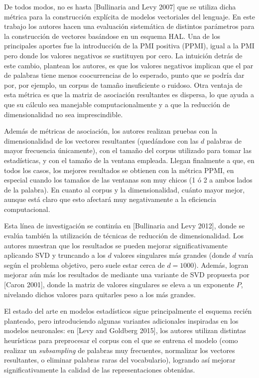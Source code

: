 De todos modos, no es hasta [Bullinaria and Levy 2007] que se utiliza dicha métrica para la
construcción explícita de modelos vectoriales del lenguaje. En este trabajo los autores hacen una
evaluación sistemática de distintos parámetros para la construcción de vectores basándose en un
esquema HAL\@. Una de los principales aportes fue la introducción de la PMI positiva (PPMI), igual a
la PMI pero donde los valores negativos se sustituyen por cero. La intuición detrás de este cambio,
plantean los autores, es que los valores negativos implican que el par de palabras tiene menos
coocurrencias de lo esperado, punto que se podría dar por, por ejemplo, un corpus de tamaño
insuficiente o ruidoso. Otra ventaja de esta métrica es que la matriz de asociación resultantes es
dispersa, lo que ayuda a que su cálculo sea manejable computacionalmente y a que la reducción de
dimensionalidad no sea imprescindible.

Además de métricas de asociación, los autores realizan pruebas con la dimensionalidad de los
vectores resultantes (quedándose con las $d$ palabras de mayor frecuencia únicamente), con el tamaño
del corpus utilizado para tomar las estadísticas, y con el tamaño de la ventana empleada. Llegan
finalmente a que, en todos los casos, los mejores resultados se obtienen con la métrica PPMI, en
especial cuando los tamaños de las ventanas son muy chicos (1 ó 2 a ambos lados de la palabra). En
cuanto al corpus y la dimensionalidad, cuánto mayor mejor, aunque está claro que esto afectará muy
negativamente a la eficiencia computacional.

Esta línea de investigación se continúa en [Bullinaria and Levy 2012], donde se evalúa también la
utilización de técnicas de reducción de dimensionalidad. Los autores muestran que los resultados se
pueden mejorar significativamente aplicando SVD y truncando a los $d$ valores singulares más grandes
(donde $d$ varía según el problema objetivo, pero suele estar cerca de $d = 1000$).  Además, logran
mejorar aún más los resultados de mediante una variante de SVD propuesta por [Caron 2001], donde la
matriz de valores singulares se eleva a un exponente $P$, nivelando dichos valores para quitarles
peso a los más grandes.


El estado del arte en modelos estadísticos sigue principalmente el esquema recién planteado, pero
introduciendo algunas variantes adicionales inspiradas en los modelos neuronales: en [Levy and
Goldberg 2015], los autores utilizan distintas heurísticas para preprocesar el corpus con el que se
entrena el modelo (como realizar un \textit{subsampling} de palabras muy frecuentes, normalizar los
vectores resultantes, o eliminar palabras raras del vocabulario), logrando así mejorar
significativamente la calidad de las representaciones obtenidas.


